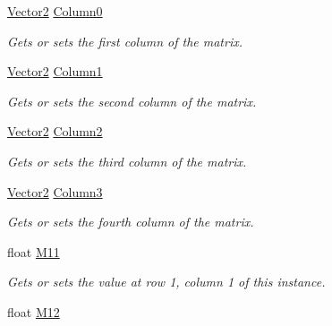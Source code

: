 \begin{DoxyCompactItemize}
\item 
\hyperlink{struct_open_t_k_1_1_vector2}{Vector2} \hyperlink{struct_open_t_k_1_1_matrix2x4_ab77adf403f71fb292be4ed6810552215}{Column0}
\begin{DoxyCompactList}\small\item\em Gets or sets the first column of the matrix. \end{DoxyCompactList}\item 
\hyperlink{struct_open_t_k_1_1_vector2}{Vector2} \hyperlink{struct_open_t_k_1_1_matrix2x4_a6e288af5ec95efa4a099da3ea0e73404}{Column1}
\begin{DoxyCompactList}\small\item\em Gets or sets the second column of the matrix. \end{DoxyCompactList}\item 
\hyperlink{struct_open_t_k_1_1_vector2}{Vector2} \hyperlink{struct_open_t_k_1_1_matrix2x4_a72eb4174af9d4ac40160c7eecfd03023}{Column2}
\begin{DoxyCompactList}\small\item\em Gets or sets the third column of the matrix. \end{DoxyCompactList}\item 
\hyperlink{struct_open_t_k_1_1_vector2}{Vector2} \hyperlink{struct_open_t_k_1_1_matrix2x4_a5faf1c70040806cddb2f43e54da6ebe4}{Column3}
\begin{DoxyCompactList}\small\item\em Gets or sets the fourth column of the matrix. \end{DoxyCompactList}\item 
float \hyperlink{struct_open_t_k_1_1_matrix2x4_ae7856857d4432b5801edbc356eef6c12}{M11}
\begin{DoxyCompactList}\small\item\em Gets or sets the value at row 1, column 1 of this instance. \end{DoxyCompactList}\item 
float \hyperlink{struct_open_t_k_1_1_matrix2x4_a312c88eb1939f9d277dbbcdb769d585b}{M12}

\end{DoxyCompactItemize}
